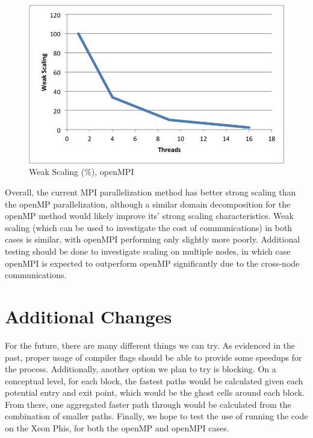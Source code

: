 \documentclass{article}
\begin{document}
	\begin{figure}[h!]
		\begin{center}
			\includegraphics[width=0.7\columnwidth]{wk_graph_mpi}
			\caption{Weak Scaling (\%), openMPI}
			\label{wk_mpi_g}
		\end{center}
	\end{figure}
	
Overall, the current MPI parallelization method has better strong scaling than the openMP parallelization, although a similar domain decomposition for the openMP method would likely improve its' strong scaling characteristics. Weak scaling (which can be used to investigate the cost of communications) in both cases is similar, with openMPI performing only slightly more poorly. Additional testing should be done to investigate scaling on multiple nodes, in which case openMPI is expected to outperform openMP significantly due to the cross-node communications.  
	

\section{Additional Changes}
For the future, there are many different things we can try. As evidenced in the past, proper usage of compiler flags should be able to provide some speedups for the process. Additionally, another option we plan to try is blocking. On a conceptual level, for each block, the fastest paths would be calculated given each potential entry and exit point, which would be the ghost cells around each block. From there, one aggregated faster path through would be calculated from the combination of smaller paths. Finally, we hope to test the use of running the code on the Xeon Phis, for both the openMP and openMPI cases.
\end{document}
